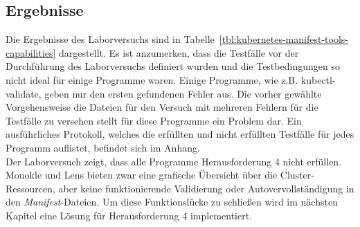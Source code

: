 \subsection{Ergebnisse}

Die Ergebnisse des Laborversuchs sind in Tabelle~\ref{tbl:kubernetes-manifest-tools-capabilities} dargestellt.
Es ist anzumerken, dass die Testfälle vor der Durchführung des Laborversuchs definiert wurden und die Testbedingungen so nicht
ideal für einige Programme waren. Einige Programme, wie z.B. kubectl-validate, geben nur den ersten gefundenen Fehler aus.
Die vorher gewählte Vorgehensweise die Dateien für den Versuch mit mehreren Fehlern für die Testfälle zu versehen stellt für
diese Programme ein Problem dar. Ein ausführliches Protokoll, welches die erfüllten und nicht erfüllten Testfälle für jedes Programm
auflistet, befindet sich im Anhang. \\
Der Laborversuch zeigt, dass alle Programme Herausforderung 4 nicht erfüllen.
Monokle und Lens bieten zwar eine grafische Übersicht über die Cluster-Ressourcen, aber keine funktionierende
Validierung oder Autovervollständigung in den \textit{Manifest}-Dateien. Um diese Funktionslücke zu schließen wird im
nächsten Kapitel eine Lösung für Herausforderung 4 implementiert.

